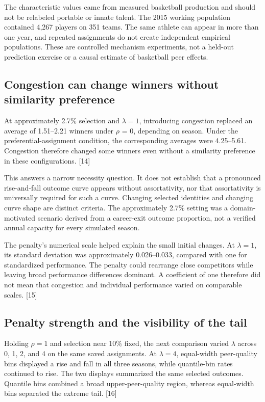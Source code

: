 The characteristic values came from measured basketball production and should not be relabeled portable or innate talent. The 2015 working population contained 4,267 players on 351 teams. The same athlete can appear in more than one year, and repeated assignments do not create independent empirical populations. These are controlled mechanism experiments, not a held-out prediction exercise or a causal estimate of basketball peer effects.

\subsection{Congestion can change winners without similarity preference}\label{congestion-can-change-winners-without-similarity-preference}

At approximately 2.7\% selection and \(\lambda = 1\), introducing congestion replaced an average of 1.51--2.21 winners under \ensuremath{\rho} = 0, depending on season. Under the preferential-assignment condition, the corresponding averages were 4.25--5.61. Congestion therefore changed some winners even without a similarity preference in these configurations. {[}14{]}

This answers a narrow necessity question. It does not establish that a pronounced rise-and-fall outcome curve appears without assortativity, nor that assortativity is universally required for such a curve. Changing selected identities and changing curve shape are distinct criteria. The approximately 2.7\% setting was a domain-motivated scenario derived from a career-exit outcome proportion, not a verified annual capacity for every simulated season.

The penalty's numerical scale helped explain the small initial changes. At \(\lambda = 1\), its standard deviation was approximately 0.026--0.033, compared with one for standardized performance. The penalty could rearrange close competitors while leaving broad performance differences dominant. A coefficient of one therefore did not mean that congestion and individual performance varied on comparable scales. {[}15{]}

\subsection{Penalty strength and the visibility of the tail}\label{penalty-strength-and-the-visibility-of-the-tail}

Holding \(\rho=1\) and selection near 10\% fixed, the next comparison varied \(\lambda\) across 0, 1, 2, and 4 on the same saved assignments. At \(\lambda = 4\), equal-width peer-quality bins displayed a rise and fall in all three seasons, while quantile-bin rates continued to rise. The two displays summarized the same selected outcomes. Quantile bins combined a broad upper-peer-quality region, whereas equal-width bins separated the extreme tail. {[}16{]}

